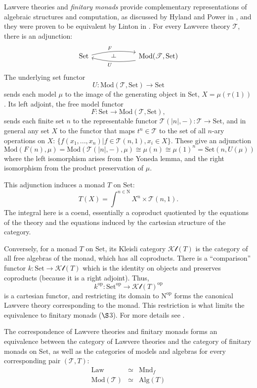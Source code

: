 \documentclass{amsart}
\theoremstyle{definition}
\def\ld{\rotatebox[origin=c]{-90}{$\dashv$}} %
\newcommand{\Set}{\mathrm{Set}}
\newcommand{\Alg}{\mathrm{Alg}}
\newcommand{\Mod}{\mathrm{Mod}}
\newcommand{\op}{\mathrm{op}}
\newcommand{\NN}{\mathrm{N}}
\newcommand{\T}{\mathscr{T}}
\newcommand{\Kl}{\mathscr{Kl}}
\newcommand{\maps}{\colon}
\begin{document}
Lawvere theories and \textit{finitary monads} provide complementary representations of algebraic structures and computation, as discussed by Hyland and Power in \cite{ltam}, and they were proven to be equivalent by Linton in \cite{linton}. For every Lawvere theory $\T$, there is an adjunction:
\[\begin{tikzcd}
	\Set \arrow[bend left=10,below]{rr}{F}
	& \ld &
	\arrow[bend left=10,above]{ll}{U} \Mod(\T,\Set)
\end{tikzcd}\]
The underlying set functor 
\[  U\maps \Mod(\T,\Set) \to \Set \]
sends each model $\mu$ to the image of the generating object in $\Set$, $X = \mu(\tau(1))$. 
Its left adjoint, the free model functor 
\[       F\maps\Set \to \Mod(\T,\Set), \]
sends each finite set $n$ to the representable functor $\T(|n|,-)\maps\T \to \Set$, and in general any set $X$ to the functor that maps $t^n \in \T$ to the set of all $n$-ary operations on $X$: $\{f(x_1,...,x_n)|f\in \T(n,1), x_i\in X\}$.  These give an adjunction
\[   \Mod(F(n),\mu) = \Mod(\T(|n|,-),\mu) \cong \mu(n) \cong \mu(1)^n = \Set(n,U(\mu))\] 
where the left isomorphism arises from the Yoneda lemma, and the right isomorphism from the product preservation of $\mu$. 

This adjunction induces a monad $T$ on $\Set$:
\begin{equation}
T(X) = \int^{n\in \NN} X^n \times \T(n,1).
\end{equation}
The integral here is a coend, essentially a coproduct quotiented by the equations of the theory and the equations induced by the cartesian structure of the category.  

Conversely, for a monad $T$ on $\Set$, its Kleisli category $\Kl(T)$ is the category of all free algebras of the monad, which has all coproducts. There is a ``comparison'' functor $k\maps \Set \to \Kl(T)$ which is the identity on objects and preserves coproducts (because it is a right adjoint).  Thus,
\[ k^{\op}\maps \Set^{\op} \to \Kl(T)^{\op} \]
is a cartesian functor, and restricting its domain to $\NN^{\op}$ forms the canonical Lawvere theory corresponding to the monad. This restriction is what limits the equivalence to finitary monads ($\S$3).  For more details see \cite{sketch,lawvere,milew}.

The correspondence of Lawvere theories and finitary monads forms an equivalence between the category of Lawvere theories and the category of finitary monads on $\Set$, as well as the categories of models and algebras for every corresponding pair $(\T, T)$:
\[\begin{array}{rcl}
	\mathrm{Law} & \simeq & \mathrm{Mnd}_f\\
	\Mod(\T) & \simeq & \Alg(T)
\end{array}\]
\end{document}
